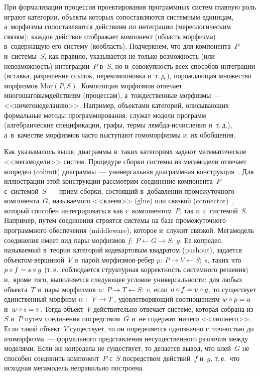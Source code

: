 \begin{multicols}{2}
   При формализации процессов проектирования программных систем главную 
роль играют категории, объекты которых сопоставляются системным 
единицам, а~морфизмы сопоставляются действиям по интеграции 
(мереологическим связям): каждое действие отображает компонент (область 
морфизма) в~содержащую его систему (кообласть). Подчеркнем, что для 
компонента~$P$ и~системы~$S$, как правило, указывается не только 
возможность (или невозможность) интеграции~$P$ в~$S$, но и~совокупность 
всех способов интеграции (вставка, разрешение ссылок, перекомпоновка 
и~т.\,д.), по\-рож\-дающая множество морфизмов $\mathrm{Mor}\left(P, S\right)$. 
Ком\-позиция морфизмов отвечает многошаговым\linebreak действи\-ям (процессам), 
а~тождественные морфизмы~--- <<ничегонеделанию>>. Например, объектами 
категорий, описывающих формальные методы программирования, служат 
модели программ (алгебраические спецификации, графы, термы  
лямб\-да-ис\-чис\-ле\-ния и~т.\,д.), а~в~качестве морфизмов часто выступают 
гомоморфизмы и~их обобщения.
   
   Как указывалось выше, диаграммы в~таких категориях задают 
математические <<мегамодели>> сис\-тем. Процедуре сборки системы из 
мегамодели отвечает копредел (colimit) диаграммы~--- универсальная 
диаграммная конструкция~\cite{11-kov}. Для иллюстрации этой конструкции 
рассмотрим соединение компонента~$P$ с~системой~$S$~--- прием сборки, 
состоящий в~добавлении промежуточного компонента~$G$, называемого 
<<клеем>> (glue) или связкой (connector)~\cite{31-kov}, который способен 
интегрироваться как с~компонентом~$P$, так и~с~системой~$S$. Например, 
путем соединения строятся системы на базе промежуточного программного 
обеспечения (middleware), которое и~служит связкой. Мегамодель соединения 
имеет вид пары морфизмов $f:\ P\leftarrow G\rightarrow S:\ g$. Ее копредел, 
называемый в~тео\-рии категорий кодекартовым квадратом (pushout), задается 
объ\-ек\-том-вер\-ши\-ной~$V$ и~парой мор\-физ\-мов-ре\-бер $p:\ P\rightarrow 
V\leftarrow S:\ s$, таких что $p\circ f\hm= s\circ g$ (т.\,е.\ соблюдается 
структурная корректность системного решения) и,~кроме того, выполняется 
следующее условие универсальности: для любых объекта~$T$ и~пары 
морфизмов $u:\ P\rightarrow T\leftarrow S:\ v$, если $u\circ f\hm= v\circ g$, то 
существует единственный морфизм $w:\ V\hm\to T$, удовлетворяющий 
соотношениям $w\circ p\hm= u$ и~$w\circ s\hm= v$. Тогда объект~$V$ 
действительно отвечает системе, которая собрана из~$S$ и~$P$ путем 
соединения посредством~$G$ и~не содержит ничего <<лишнего>>. Если такой 
объект~$V$ существует, то он определяется однозначно с~точностью до 
изоморфизма~--- формального представления несущественного различия 
между моделями. Если же копредела не существует, то делается вывод, что 
клей~$G$ не способен соединить компонент~$P$ с~$S$ посредством 
действий~$f$ и~$g$, т.\,е.\ что исходная мегамодель неправильно построена.
   

\end{multicols}
